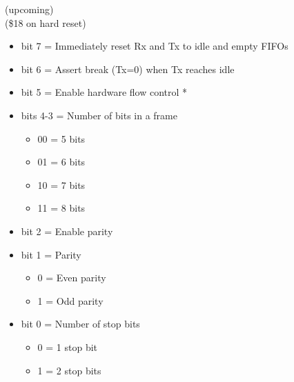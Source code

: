  (upcoming)\\
(\$18 on hard reset)
\begin{itemize}
\item[] bit 7 = Immediately reset Rx and Tx to idle and empty FIFOs
\item[] bit 6 = Assert break (Tx=0) when Tx reaches idle
\item[] bit 5 = Enable hardware flow control *
\item[] bits 4-3 = Number of bits in a frame
  \begin{itemize}
  \item[] 00 = 5 bits
  \item[] 01 = 6 bits
  \item[] 10 = 7 bits
  \item[] 11 = 8 bits
  \end{itemize}
\item[] bit 2 = Enable parity
\item[] bit 1 = Parity
  \begin{itemize}
  \item[] 0 = Even parity
  \item[] 1 = Odd parity
  \end{itemize}
\item[] bit 0 = Number of stop bits
  \begin{itemize}
  \item[] 0 = 1 stop bit
  \item[] 1 = 2 stop bits
  \end{itemize}
\end{itemize}
